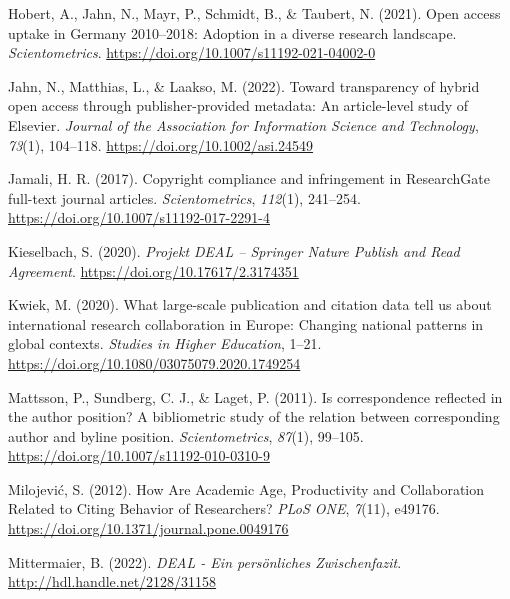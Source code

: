 \documentclass[
]{article}
\newlength{\cslhangindent}
\newlength{\cslentryspacingunit} %
\newenvironment{CSLReferences}[2] %
 {%
  \setlength{\parindent}{0pt}
  \ifodd #1
  \let\oldpar\par
  \def\par{\hangindent=\cslhangindent\oldpar}
  \fi
  \setlength{\parskip}{#2\cslentryspacingunit}
 }%
 {}
\begin{document}
\begin{CSLReferences}{1}{0}
\leavevmode{}%
Hobert, A., Jahn, N., Mayr, P., Schmidt, B., \& Taubert, N. (2021). Open access uptake in {Germany} 2010--2018: Adoption in a diverse research landscape. \emph{Scientometrics}. \url{https://doi.org/10.1007/s11192-021-04002-0}

\leavevmode{}%
Jahn, N., Matthias, L., \& Laakso, M. (2022). Toward transparency of hybrid open access through publisher-provided metadata: An article-level study of {Elsevier}. \emph{Journal of the Association for Information Science and Technology}, \emph{73}(1), 104--118. \url{https://doi.org/10.1002/asi.24549}

\leavevmode{}%
Jamali, H. R. (2017). Copyright compliance and infringement in {ResearchGate} full-text journal articles. \emph{Scientometrics}, \emph{112}(1), 241--254. \url{https://doi.org/10.1007/s11192-017-2291-4}

\leavevmode{}%
Kieselbach, S. (2020). \emph{Projekt {DEAL} -- {Springer} {Nature} {Publish} and {Read} {Agreement}}. \url{https://doi.org/10.17617/2.3174351}

\leavevmode{}%
Kwiek, M. (2020). What large-scale publication and citation data tell us about international research collaboration in {Europe}: Changing national patterns in global contexts. \emph{Studies in Higher Education}, 1--21. \url{https://doi.org/10.1080/03075079.2020.1749254}

\leavevmode{}%
Mattsson, P., Sundberg, C. J., \& Laget, P. (2011). Is correspondence reflected in the author position? {A} bibliometric study of the relation between corresponding author and byline position. \emph{Scientometrics}, \emph{87}(1), 99--105. \url{https://doi.org/10.1007/s11192-010-0310-9}

\leavevmode{}%
Milojević, S. (2012). How {Are} {Academic} {Age}, {Productivity} and {Collaboration} {Related} to {Citing} {Behavior} of {Researchers}? \emph{PLoS ONE}, \emph{7}(11), e49176. \url{https://doi.org/10.1371/journal.pone.0049176}

\leavevmode{}%
Mittermaier, B. (2022). \emph{{DEAL} - {E}in persönliches {Z}wischenfazit}. \url{http://hdl.handle.net/2128/31158}


\end{CSLReferences}
\end{document}
